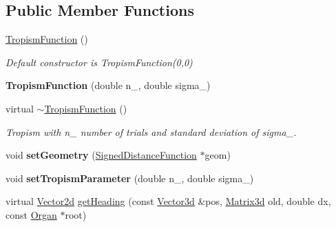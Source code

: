 \subsection*{Public Member Functions}
\begin{DoxyCompactItemize}
\item 
\mbox{\label{classCPlantBox_1_1TropismFunction_af21da3e1e3abefb8fec5e4e9fefe6c45}} 
\hyperlink{classCPlantBox_1_1TropismFunction_af21da3e1e3abefb8fec5e4e9fefe6c45}{Tropism\+Function} ()
\begin{DoxyCompactList}\small\item\em Default constructor is Tropism\+Function(0,0) \end{DoxyCompactList}\item 
\mbox{\label{classCPlantBox_1_1TropismFunction_a8d8dc0c54a67cb47822a551f00e87deb}} 
{\bfseries Tropism\+Function} (double n\+\_\+, double sigma\+\_\+)
\item 
\mbox{\label{classCPlantBox_1_1TropismFunction_a8d97559be7605a8fb2a1093a0ae0237b}} 
virtual \hyperlink{classCPlantBox_1_1TropismFunction_a8d97559be7605a8fb2a1093a0ae0237b}{$\sim$\+Tropism\+Function} ()
\begin{DoxyCompactList}\small\item\em Tropism with n\+\_\+ number of trials and standard deviation of sigma\+\_\+. \end{DoxyCompactList}\item 
\mbox{\label{classCPlantBox_1_1TropismFunction_a1c6885198829dd66d3cdba4c0b565d88}} 
void {\bfseries set\+Geometry} (\hyperlink{classCPlantBox_1_1SignedDistanceFunction}{Signed\+Distance\+Function} $\ast$geom)
\item 
\mbox{\label{classCPlantBox_1_1TropismFunction_ad9777a3fba9e6ecd0d184ecf931211ed}} 
void {\bfseries set\+Tropism\+Parameter} (double n\+\_\+, double sigma\+\_\+)
\item 
virtual \hyperlink{classCPlantBox_1_1Vector2d}{Vector2d} \hyperlink{classCPlantBox_1_1TropismFunction_adb52b88734a94fe1365a00e02c7e6be5}{get\+Heading} (const \hyperlink{classCPlantBox_1_1Vector3d}{Vector3d} \&pos, \hyperlink{classCPlantBox_1_1Matrix3d}{Matrix3d} old, double dx, const \hyperlink{classCPlantBox_1_1Organ}{Organ} $\ast$root)

\end{DoxyCompactItemize}
